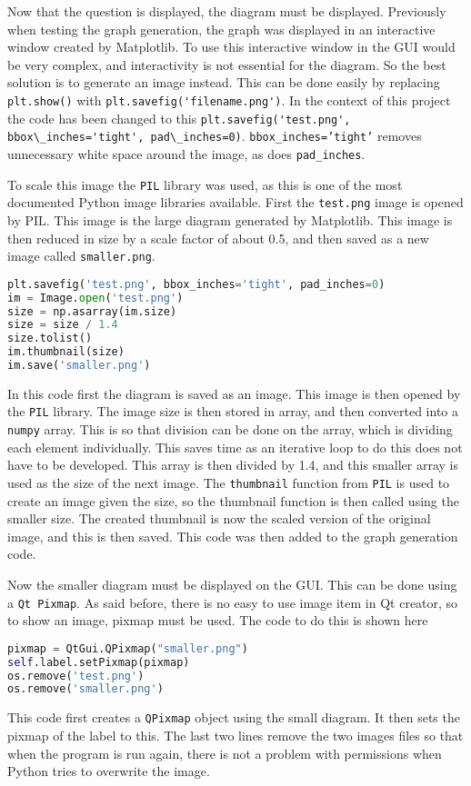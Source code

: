 Now that the question is displayed, the diagram must be displayed. Previously when testing the graph generation, the graph was displayed in an interactive window created by Matplotlib. To use this interactive window in the GUI would be very complex, and interactivity is not essential for the diagram. So the best solution is to generate an image instead. This can be done easily by replacing \lstinline|plt.show()| with \lstinline|plt.savefig('filename.png')|. In the context of this project the code has been changed to this \lstinline|plt.savefig('test.png', bbox\_inches='tight', pad\_inches=0)|. \texttt{bbox\_inches='tight'} removes unnecessary white space around the image, as does \texttt{pad\_inches}. 

To scale this image the \texttt{PIL} library was used, as this is one of the most documented Python image libraries available. First the \texttt{test.png} image is opened by PIL. This image is the large diagram generated by Matplotlib. This image is then reduced in size by a scale factor of about 0.5, and then saved as a new image called \texttt{smaller.png}.
\begin{lstlisting}[language=Python, caption=Code to scale image keeping aspect ratio]
plt.savefig('test.png', bbox_inches='tight', pad_inches=0)
im = Image.open('test.png') 
size = np.asarray(im.size)
size = size / 1.4
size.tolist()
im.thumbnail(size)
im.save('smaller.png')
\end{lstlisting}
In this code first the diagram is saved as an image. This image is then opened by the \texttt{PIL} library. The image size is then stored in array, and then converted into a \texttt{numpy} array. This is so that division can be done on the array, which is dividing each element individually. This saves time as an iterative loop to do this does not have to be developed. This array is then divided by 1.4, and this smaller array is used as the size of the next image. The \texttt{thumbnail} function from \texttt{PIL} is used to create an image given the size, so the thumbnail function is then called using the smaller size. The created thumbnail is now the scaled version of the original image, and this is then saved. This code was then added to the graph generation code.

Now the smaller diagram must be displayed on the GUI. This can be done using a \texttt{Qt Pixmap}. As said before, there is no easy to use image item in Qt creator, so to show an image, pixmap must be used. The code to do this is shown here
\begin{lstlisting}[language=Python, caption=Setting a label to display an image]
pixmap = QtGui.QPixmap("smaller.png")
self.label.setPixmap(pixmap)
os.remove('test.png')
os.remove('smaller.png')
\end{lstlisting}
This code first creates a \texttt{QPixmap} object using the small diagram. It then sets the pixmap of the label to this. The last two lines remove the two images files so that when the program is run again, there is not a problem with permissions when Python tries to overwrite the image.

